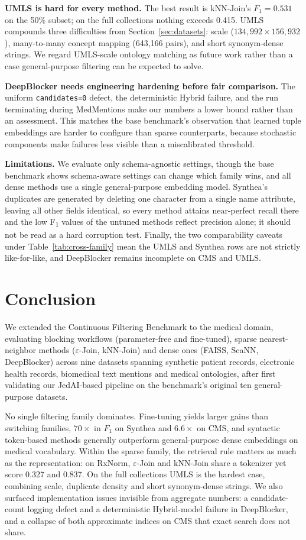 \documentclass[runningheads]{llncs}
\begin{document}
\textbf{UMLS is hard for every method.} The best result is kNN-Join's $F_1=0.531$ on the 50\%
subset; on the full collections nothing exceeds 0.415. UMLS compounds three difficulties from
Section~\ref{sec:datasets}: scale ($134{,}992 \times 156{,}932$), many-to-many concept mapping
(643{,}166 pairs), and short synonym-dense strings. We regard UMLS-scale
ontology matching as future work rather than a case general-purpose filtering can be expected
to solve.

\textbf{DeepBlocker needs engineering hardening before fair comparison.} The uniform
\texttt{candidates=0} defect, the deterministic Hybrid failure, and the run terminating during
MedMentions make our numbers a lower bound rather than an assessment. This matches the base
benchmark's observation that learned tuple embeddings are harder to configure than sparse
counterparts, because stochastic components make failures less visible than a miscalibrated
threshold.

\textbf{Limitations.} We evaluate only schema-agnostic settings, though the base benchmark shows
schema-aware settings can change which family wins, and all dense methods use a single
general-purpose embedding model. Synthea's duplicates are generated by deleting one character from a single name attribute,
leaving all other fields identical, so every method attains near-perfect recall there and the
low F\textsubscript{1} values of the untuned methods reflect precision alone; it should not be
read as a hard corruption test. Finally, the
two comparability caveats under Table~\ref{tab:cross-family} mean the UMLS and Synthea rows are
not strictly like-for-like, and DeepBlocker remains incomplete on CMS and UMLS.


\section{Conclusion}
\label{sec:conclusion}
We extended the Continuous Filtering Benchmark to the medical domain, evaluating blocking
workflows (parameter-free and fine-tuned), sparse nearest-neighbor methods
($\varepsilon$-Join, kNN-Join) and dense ones (FAISS, ScaNN, DeepBlocker) across nine datasets
spanning synthetic patient records, electronic health records, biomedical text mentions and
medical ontologies, after first validating our JedAI-based pipeline on the benchmark's original
ten general-purpose datasets.

No single filtering family dominates. Fine-tuning yields larger gains than switching families,
$70\times$ in $F_1$ on Synthea and $6.6\times$ on CMS, and syntactic token-based methods
generally outperform general-purpose dense embeddings on medical vocabulary. Within the sparse
family, the retrieval rule matters as much as the representation: on RxNorm, $\varepsilon$-Join
and kNN-Join share a tokenizer yet score 0.327 and 0.837. On the full collections UMLS is the
hardest case, combining scale, duplicate density and short synonym-dense strings. We also
surfaced implementation issues invisible from aggregate numbers: a candidate-count logging
defect and a deterministic Hybrid-model failure in DeepBlocker, and a collapse of both
approximate indices on CMS that exact search does not share.
\end{document}
